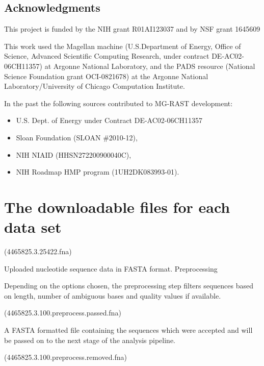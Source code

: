 \documentclass[letterpaper,10pt,english]{sphinxmanual}
\begin{document}
\section{Acknowledgments}
\label{\detokenize{user_manual:acknowledgments}}
This project is funded by the NIH grant R01AI123037 and by NSF grant
1645609

This work used the Magellan machine (U.S.Department of Energy, Office of
Science, Advanced Scientific Computing Research, under contract
DE-AC02-06CH11357) at Argonne National Laboratory, and the PADS resource
(National Science Foundation grant OCI-0821678) at the Argonne National
Laboratory/University of Chicago Computation Institute.

In the past the following sources contributed to MG-RAST development:
\begin{itemize}
\item {} 
U.S. Dept. of Energy under Contract DE-AC02-06CH11357

\item {} 
Sloan Foundation (SLOAN \#2010-12),

\item {} 
NIH NIAID (HHSN272200900040C),

\item {} 
NIH Roadmap HMP program (1UH2DK083993-01).

\end{itemize}


\chapter{The downloadable files for each data set}
\label{\detokenize{user_manual:the-downloadable-files-for-each-data-set}}\label{\detokenize{user_manual:chapter-downloads}}
 (4465825.3.25422.fna)

Uploaded nucleotide sequence data in FASTA format. Preprocessing

Depending on the options chosen, the preprocessing step filters
sequences based on length, number of ambiguous bases and quality values
if available.

 (4465825.3.100.preprocess.passed.fna)

A FASTA formatted file containing the sequences which were accepted and
will be passed on to the next stage of the analysis pipeline.

 (4465825.3.100.preprocess.removed.fna)
\end{document}
